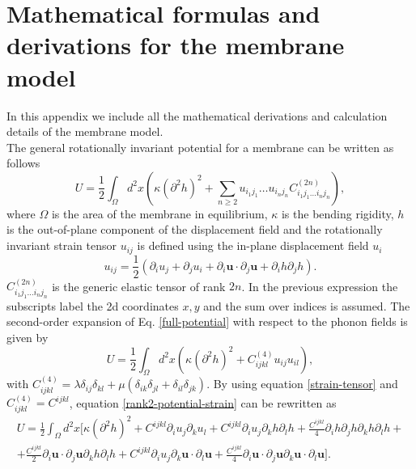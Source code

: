 
\chapter{Mathematical formulas and derivations for the membrane model} %

\label{appendixA} %

In this appendix we include all the mathematical derivations and calculation details of the membrane model. \\

The general rotationally invariant potential for a membrane can be written as follows
\begin{equation}
 \label{full-potential}
 U=\frac{1}{2}\int_{\Omega}{d^{2}x\left(\kappa(\partial^{2}h)^{2}+\sum_{n\geq 2}u_{i_{1}j_{1}}\dots u_{i_{n}j_{n}}C_{i_{1}j_{1}\dots i_{n}j_{n}}^{(2n)}\right)},
\end{equation}
where $\Omega$ is the area of the membrane in equilibrium, $\kappa$ is the bending rigidity, $h$ is the
out-of-plane component of the displacement field and the rotationally invariant strain tensor $u_{ij}$ is defined
using the in-plane displacement field $u_{i}$
\begin{equation}
 \label{strain-tensor}
 u_{ij}=\frac{1}{2}(\partial_{i}u_{j}+\partial_{j}u_{i}+\partial_{i}\boldsymbol{u}\cdot\partial_{j}\boldsymbol{u}+\partial_{i}h\partial_{j}h).
\end{equation}
$C^{(2n)}_{i_{1}j_{1}\dots i_{n}j_{n}}$ is the generic elastic tensor of rank $2n$. In the previous expression the
subscripts label the 2d coordinates $x,y$ and the sum over indices is assumed. The second-order expansion of
Eq. \ref{full-potential} with respect to the phonon fields is given by
\begin{equation}
 \label{rank2-potential-strain}
 U=\frac{1}{2}\int_{\Omega}{d^{2}x\left(\kappa(\partial^{2}h)^{2}+C^{(4)}_{ijkl}u_{ij}u_{il}\right)},
\end{equation}
with $C^{(4)}_{ijkl}=\lambda\delta_{ij}\delta_{kl}+\mu(\delta_{ik}\delta_{jl}+\delta_{il}\delta_{jk})$. By using
equation \ref{strain-tensor} and $C_{ijkl}^{(4)}=C^{ijkl}$, equation \ref{rank2-potential-strain} can be rewritten as
\begin{multline}
 \label{rank2-potential-disp}
 U=\frac{1}{2}\int_{\Omega}d^{2}x[\kappa(\partial^{2}h)^{2}+C^{ijkl}\partial_{i}u_{j}\partial_{k}u_{l}+C^{ijkl}\partial_{i}u_{j}\partial_{k}h\partial_{l}h+\frac{C^{ijkl}}{4}\partial_{i}h\partial_{j}h\partial_{
 k}h\partial_{l}h+\\+\frac{C^{ijkl}}{2}\partial_{i}\boldsymbol{u}\cdot\partial_{j}\boldsymbol{u}\partial_{k}h\partial_{l}h+C^{ijkl}\partial_{i}u_{j}\partial_{k}\boldsymbol{u}\cdot\partial_{l}\boldsymbol{u}+
\frac{C^{ijkl}}{4}\partial_{i}\boldsymbol{u}\cdot\partial_{j}\boldsymbol{u}\partial_{k}\boldsymbol{u}\cdot\partial_{l}\boldsymbol{u}].
\end{multline}
